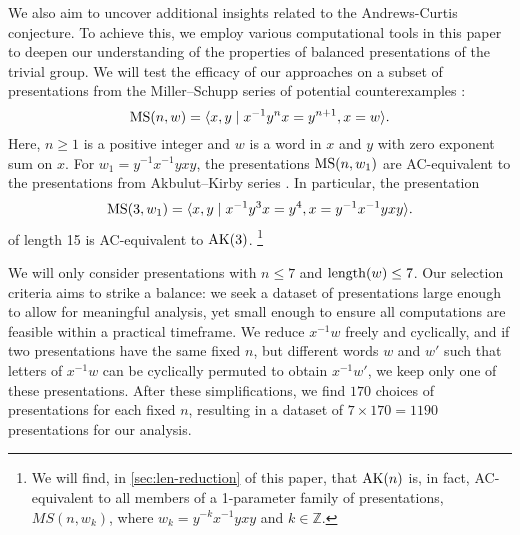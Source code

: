 We also aim to uncover additional insights related to the Andrews-Curtis conjecture. To achieve this, we employ various computational tools in this paper to deepen our understanding of the properties of balanced presentations of the trivial group.
We will test the efficacy of our approaches on a subset of presentations from the Miller--Schupp series of potential counterexamples \cite{Miller--Schupp}:
\[
\text{MS}(n, w) = \langle x, y \mid x^{-1} y^n x = y^{n+1}, x = w\rangle.
\]
Here, $n \ge 1$ is a positive integer and $w$ is a word in $x$ and $y$ with zero exponent sum on $x$.
For $w_1 = y^{-1} x^{-1} y x y$, the presentations $\text{MS}(n, w_1)$ are AC-equivalent to the presentations from Akbulut--Kirby series \cite{MMS}.
In particular, the presentation
\[
\text{MS}(3, w_1) = \langle x, y \mid x^{-1} y^3 x = y^{4}, x = y^{-1} x^{-1} y x y\rangle.
\]
of length 15 is AC-equivalent to $\text{AK}(3)$.
\footnote{We will find, in \cref{sec:len-reduction} of this paper, that $\text{AK}(n)$ is, in fact, AC-equivalent to all members of a 1-parameter family of presentations, $MS(n, w_k)$, where $w_k = y^{-k} x^{-1} y x y$ and $k \in \mathbb{Z}$.}

We will only consider presentations with $n \leq 7$ and $\operatorname{length}(w) \leq 7$.
Our selection criteria aims to strike a balance: we seek a dataset of presentations large enough to allow for meaningful analysis, yet small enough to ensure all computations are feasible within a practical timeframe.
We reduce $x^{-1}w$ freely and cyclically, and if two presentations have the same fixed $n$, but different words $w$ and $w'$ such that letters of $x^{-1} w$ can be cyclically permuted to obtain $x^{-1} w'$, we keep only one of these presentations.
After these simplifications, we find $170$ choices of presentations for each fixed $n$, resulting in a dataset of $7 \times 170 = 1190$ presentations for our analysis.


